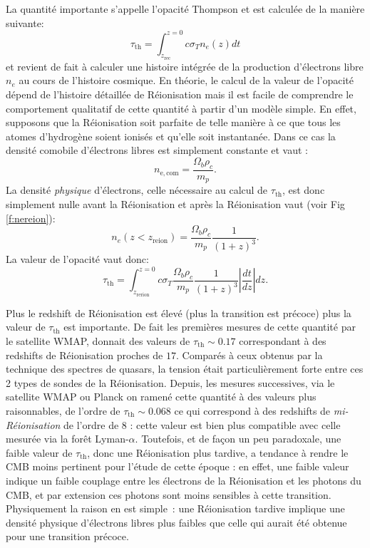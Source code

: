 La quantité importante s'appelle l'opacité Thompson et est calculée de la manière suivante:
\begin{equation}
\tau_\mathrm{th}=\int_{z_\mathrm{rec}}^{z=0} c \sigma_T n_e(z) dt
\end{equation}
et revient de fait à calculer une histoire intégrée de la production d'électrons libre $n_e$ au cours de l'histoire cosmique. En théorie, le calcul de la valeur de l'opacité dépend de l'histoire détaillée de Réionisation mais il est facile de comprendre le comportement qualitatif de cette quantité à partir d'un modèle simple. En effet, supposons que la Réionisation soit parfaite de telle manière à ce que tous les atomes d'hydrogène soient ionisés et qu'elle soit instantanée. Dans ce cas la densité comobile d'électrons libres est simplement constante et vaut :
\begin{equation}
n_\mathrm{e,com}=\frac{\Omega_b \rho_c}{m_p}.
\end{equation}
La densité \textit{physique} d'électrons, celle nécessaire au calcul de $\tau_\mathrm{th}$, est donc simplement nulle avant la Réionisation et après la Réionisation vaut (voir Fig \ref{f:nereion}):
\begin{equation}
n_e(z<z_\mathrm{reion})=\frac{\Omega_b \rho_c}{m_p} \frac{1}{(1+z)^3}.
\end{equation}
La valeur de l'opacité vaut donc:
\begin{equation}
\tau_\mathrm{th}=\int_{z_\mathrm{rerion}}^{z=0} c \sigma_T\frac{\Omega_b \rho_c}{m_p} \frac{1}{(1+z)^3}  |\frac{dt}{dz}| dz.
\end{equation}

Plus le redshift de Réionisation est élevé (plus la transition est précoce) plus la valeur de $\tau_\mathrm{th}$ est importante. De fait les premières mesures de cette quantité par le satellite WMAP, donnait des valeurs de $\tau_\mathrm{th}\sim 0.17$ correspondant à des redshifts de Réionisation proches de $17$. Comparés à ceux obtenus par la technique des spectres de quasars, la tension était particulièrement forte entre ces 2 types de sondes de la Réionisation. Depuis, les mesures successives, via le satellite WMAP ou Planck on ramené cette quantité à des valeurs plus raisonnables, de l'ordre de $\tau_\mathrm{th}\sim 0.068$ ce qui correspond à des redshifts de \textit{mi-Réionisation} de l'ordre de 8 : cette valeur est bien plus compatible avec celle mesurée via la forêt Lyman-$\alpha$. Toutefois, et de façon un peu paradoxale, une faible valeur de $\tau_\mathrm{th}$, donc une Réionisation plus tardive, a tendance à rendre le CMB moins pertinent pour l'étude de cette époque : en effet, une faible valeur indique un faible couplage entre les électrons de la Réionisation et les photons du CMB, et par extension ces photons sont moins sensibles à cette transition. Physiquement la raison en est simple~: une Réionisation tardive implique une densité physique d'électrons libres plus faibles que celle qui aurait été obtenue pour une transition précoce.

